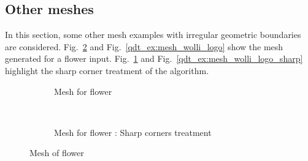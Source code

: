 \subsection{Other meshes}
In this section, some other mesh examples with irregular geometric boundaries are considered.
Fig.~\ref{qdt_ex:mesh_flower} and Fig.~\ref{qdt_ex:mesh_wolli_logo} show the mesh generated for a flower input.
Fig.~\ref{qdt_ex:mesh_flower_corners} and Fig.~\ref{qdt_ex:mesh_wolli_logo_sharp} highlight the sharp corner treatment of the algorithm.
\begin{figure}[h!]
    \begin{subfigure}[b]{1\linewidth}
        \centering
        \caption{Mesh for flower}
    \end{subfigure}
    \\
    \begin{subfigure}[b]{1\linewidth}
        \centering
        \caption{Mesh for flower : Sharp corners treatment}
        \label{qdt_ex:mesh_flower_corners}
    \end{subfigure}
    \caption{Mesh of flower}
    \label{qdt_ex:mesh_flower}
\end{figure}

